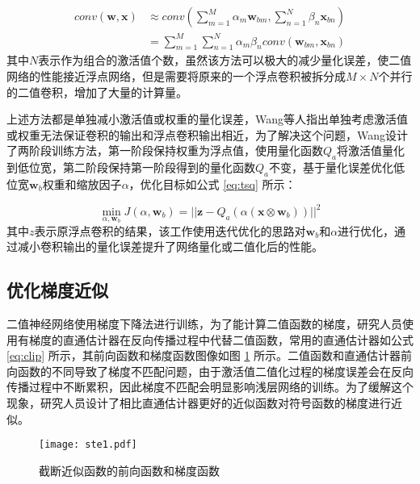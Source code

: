 \begin{equation}
  \label{eq:abcnet_conv}
  \begin{split}
  conv(\bm{w}, \bm{x}) & \approx conv(\sum_{m = 1}^{M} \alpha_m \bm{w}_{bm}, \sum_{n = 1}^{N} \beta_n \bm{x}_{bn}) \\
  & = \sum_{m = 1}^{M} \sum_{n = 1}^{N} \alpha_m \beta_n conv(\bm{w}_{bm}, \bm{x}_{bn})
  \end{split}
\end{equation}
其中$N$表示作为组合的激活值个数，虽然该方法可以极大的减少量化误差，使二值网络的性能接近浮点网络，但是需要将原来的一个浮点卷积被拆分成$M \times N$个并行的二值卷积，增加了大量的计算量。

上述方法都是单独减小激活值或权重的量化误差，Wang等人\cite{tsq}指出单独考虑激活值或权重无法保证卷积的输出和浮点卷积输出相近，为了解决这个问题，Wang设计了两阶段训练方法，第一阶段保持权重为浮点值，使用量化函数$Q_a$将激活值量化到低位宽，第二阶段保持第一阶段得到的量化函数$Q_a$不变，基于量化误差优化低位宽$\bm{w}_b$权重和缩放因子$\alpha$，优化目标如公式 \eqref{eq:tsq} 所示：

\begin{equation}
  \label{eq:tsq}
  \min_{\alpha, \bm{w}_b} J(\alpha, \bm{w}_b) = ||\bm{z} - Q_a(\alpha(\bm{x} \otimes \bm{w}_b))||^2
\end{equation}
其中$z$表示原浮点卷积的结果，该工作使用迭代优化的思路对$\bm{w}_b$和$\alpha$进行优化，通过减小卷积输出的量化误差提升了网络量化或二值化后的性能。

\subsection{优化梯度近似}

二值神经网络使用梯度下降法进行训练，为了能计算二值函数的梯度，研究人员使用有梯度的直通估计器在反向传播过程中代替二值函数，常用的直通估计器如公式 \eqref{eq:clip} 所示，其前向函数和梯度函数图像如图 \ref{fig:clip} 所示。二值函数和直通估计器前向函数的不同导致了梯度不匹配问题，由于激活值二值化过程的梯度误差会在反向传播过程中不断累积，因此梯度不匹配会明显影响浅层网络的训练。为了缓解这个现象，研究人员设计了相比直通估计器更好的近似函数对符号函数的梯度进行近似。

\begin{figure}[htb]
  \vspace{6pt}
  \centering
  \texttt{[image: ste1.pdf]}
  \caption{截断近似函数的前向函数和梯度函数}
  \label{fig:clip}
\end{figure}

